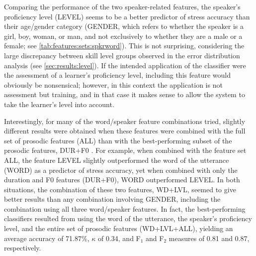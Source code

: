 	Comparing the performance of the two speaker-related features, the speaker's proficiency level (LEVEL) seems to be a better predictor of stress accuracy than their age/gender category (GENDER, which refers to whether the speaker is a girl, boy, woman, or man, and not exclusively to whether they are a male or a female; see \cref{tab:features:sets:spkrword}). This is not surprising, considering the large discrepancy between skill level groups observed in the error distribution analysis (see \cref{sec:results:level}). If the intended application of the classifier were the assessment of a learner's proficiency level, including this feature would obviously be nonsensical; however, in this context the application is not assessment but training, and in that case it makes sense to allow the system to take the learner's level into account. 
		
		
		
		
		Interestingly, for many of the word/speaker feature combinations tried, 
		slightly %
		different results were
		obtained when these features were combined with the full set of prosodic features (ALL) than with the best-performing subset of the prosodic features, DUR+F0 . For example, when combined with the feature set ALL, the feature LEVEL slightly outperformed the word of the utterance (WORD) as a predictor of stress accuracy, yet when combined with only the duration and F0 features (DUR+F0), WORD outperformed LEVEL. In both situations, the combination of these two features, WD+LVL, seemed to give better results than any combination involving GENDER, including the combination using all three word/speaker features. In fact, the best-performing classifiers 
		resulted from using the word of the utterance, the speaker's proficiency level, and the entire set of prosodic features (WD+LVL+ALL), yielding an average accuracy of 71.87\%, $\kappa$ of 0.34, and F$_1$ and F$_2$ measures of 0.81 and 0.87, respectively.
		
		
		
